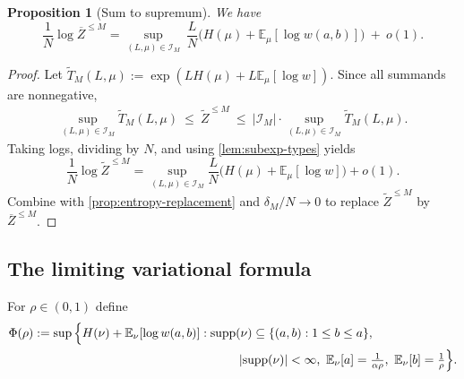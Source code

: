 \documentclass[11pt]{amsart}
\numberwithin{equation}{section}
\numberwithin{equation}{section}
\newcommand{\1}{\mathbbm{1}}
\newcommand{\E}{\mathbb{E}}
\newcommand{\supp}{\textup{supp}}
\newtheorem{proposition}[theorem]{Proposition}
\theoremstyle{definition}
\begin{document}
\begin{proposition}[Sum to supremum]\label{prop:sum-to-sup}
We have
\begin{equation}\label{eq:bar-sup}
\frac{1}{N}\log \overline{Z}^{\le M}
=\sup_{(L,\mu)\in\mathcal I_M}\ \frac{L}{N}\Big(H(\mu)+\E_\mu[\log w(a,b)]\Big)\ +\ o(1).
\end{equation}
\end{proposition}

\begin{proof}
Let $\widetilde T_M(L,\mu):=\exp(LH(\mu)+L\E_\mu[\log w])$. Since all summands are nonnegative,
\begin{align*}
    \sup_{(L,\mu)\in\mathcal I_M}\widetilde T_M(L,\mu)
    \ \le\ \widetilde{Z}^{\le M}\ \le\ |\mathcal I_M|\cdot \sup_{(L,\mu)\in\mathcal I_M}\widetilde T_M(L,\mu).
\end{align*}
Taking logs, dividing by $N$, and using \cref{lem:subexp-types} yields
\[
\frac{1}{N}\log\widetilde{Z}^{\le M}
=\sup_{(L,\mu)\in\mathcal I_M} \frac{L}{N}\Big(H(\mu)+\E_\mu[\log w]\Big)+o(1).
\]
Combine with \cref{prop:entropy-replacement} and $\delta_M/N\to 0$ to replace $\widetilde{Z}^{\le M}$ by $\overline{Z}^{\le M}$.
\end{proof}

\subsection{The limiting variational formula}

For $\rho\in(0,1)$ define
\begin{align}
    \Phi(\rho) :=\sup\Big\{H(\nu)+\E_{\nu}[\log w(a,b)]:\; &\supp(\nu)\subseteq \{(a,b):1\le b\le a\}, \label{eq:Phi-def}\\
    &\qquad \ |\supp(\nu)|<\infty,\ \E_\nu[a]=\tfrac{1}{\alpha\rho},\ \E_\nu[b]=\tfrac{1}{\rho}\Big\}.\nonumber 
\end{align}
\end{document}
